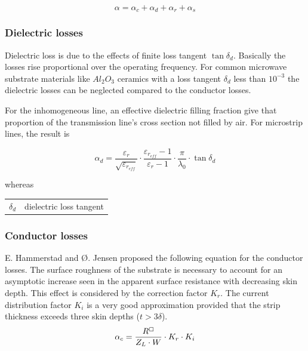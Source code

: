 \documentclass[10pt]{report}
\begin{document}
\begin{equation}
\alpha = \alpha_c + \alpha_d + \alpha_r + \alpha_s
\end{equation}

\subsubsection{Dielectric losses}

Dielectric loss is due to the effects of finite loss tangent
$\tan{\delta_d}$. Basically the losses rise proportional over the
operating frequency.  For common microwave substrate materials like
$Al_2O_3$ ceramics with a loss tangent $\delta_d$ less than $10^{-3}$
the dielectric losses can be neglected compared to the conductor
losses.

\addvspace{12pt}

For the inhomogeneous line, an effective dielectric filling fraction
give that proportion of the transmission line's cross section not
filled by air.  For microstrip lines, the result is

\begin{equation}
\alpha_d = \dfrac{\varepsilon_r}{\sqrt{\varepsilon_{r_{eff}}}}\cdot \dfrac{\varepsilon_{r_{eff}} - 1}{\varepsilon_r - 1}\cdot \dfrac{\pi}{\lambda_0}\cdot \tan{\delta_d}
\end{equation}

whereas

\addvspace{12pt}

\begin{tabular}{rl}
$\delta_d$& dielectric loss tangent
\end{tabular}

\subsubsection{Conductor losses}

E. Hammerstad and {\O}. Jensen \cite{Hammerstad} proposed the following
equation for the conductor losses.  The surface roughness of the
substrate is necessary to account for an asymptotic increase seen in
the apparent surface resistance with decreasing skin depth.  This
effect is considered by the correction factor $K_r$.  The current
distribution factor $K_i$ is a very good approximation provided that
the strip thickness exceeds three skin depths ($t > 3\delta$).
\begin{equation}
\alpha_c = \dfrac{R^{\boxempty}}{Z_L \cdot W}\cdot K_r \cdot K_i
\end{equation}
\end{document}
